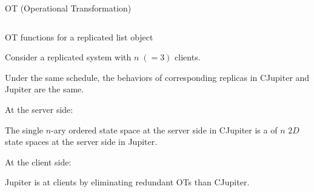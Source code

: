 \begin{frame}{}
  \centerline{OT (Operational Transformation)~}

  \begin{columns}
      \begin{center}
	
      \end{center}
      \begin{center}
	
      \end{center}
  \end{columns}
\end{frame}

\begin{frame}{}
  \centerline{\large OT functions for a replicated list object~}

  \resizebox{\textwidth}{!}{
    \begin{minipage}{\textwidth}
      
    \end{minipage}
  }
\end{frame}

\begin{frame}{}
  \centerline{\large Consider a replicated system with $n \; (=3)$ clients.}

\end{frame}

\begin{frame}{}
  \begin{Theorem}
    Under the same schedule, the behaviors of corresponding replicas in CJupiter and Jupiter are the same.
  \end{Theorem}

  \vspace{0.30cm}
  \centerline{\large At the server side:}
  \begin{prop}
    The single $n$-ary ordered state space at the server side in CJupiter 
    is a  of $n$ $2D$ state spaces at the server side in Jupiter.
  \end{prop}

  \vspace{0.30cm}
  \centerline{\large At the client side:}
  \begin{prop}
    Jupiter is  at clients by eliminating redundant OTs than CJupiter.
  \end{prop}
\end{frame}

